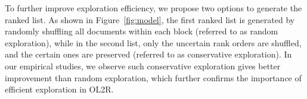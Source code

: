 To further improve exploration efficiency, we propose two options to generate the ranked list. As shown in Figure~\ref{fig:model}, the first ranked list is generated by randomly shuffling all documents within each block (referred to as random exploration), while in the second list, only the uncertain rank orders are shuffled, and the certain ones are preserved (referred to as conservative exploration). In our empirical studies, we observe such conservative exploration gives better improvement than random exploration, which further confirms the importance of efficient exploration in OL2R.